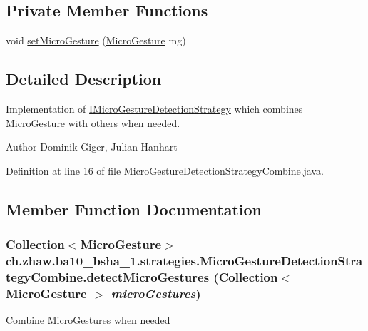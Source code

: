 \subsection*{Private Member Functions}
\begin{DoxyCompactItemize}
\item 
void \hyperlink{classch_1_1zhaw_1_1ba10__bsha__1_1_1strategies_1_1MicroGestureDetectionStrategyCombine_a06f12711cc267a6f8647dfb6faeb4787}{setMicroGesture} (\hyperlink{classch_1_1zhaw_1_1ba10__bsha__1_1_1service_1_1MicroGesture}{MicroGesture} mg)
\end{DoxyCompactItemize}


\subsection{Detailed Description}
Implementation of \hyperlink{interfacech_1_1zhaw_1_1ba10__bsha__1_1_1strategies_1_1IMicroGestureDetectionStrategy}{IMicroGestureDetectionStrategy} which combines \hyperlink{}{MicroGesture} with others when needed.

\begin{DoxyAuthor}{Author}
Dominik Giger, Julian Hanhart 
\end{DoxyAuthor}


Definition at line 16 of file MicroGestureDetectionStrategyCombine.java.

\subsection{Member Function Documentation}
\hypertarget{classch_1_1zhaw_1_1ba10__bsha__1_1_1strategies_1_1MicroGestureDetectionStrategyCombine_a5487e41dc2d1b6dbe493b5a8420c050f}{
\subsubsection[{detectMicroGestures}]{\setlength{\rightskip}{0pt plus 5cm}Collection$<${\bf MicroGesture}$>$ ch.zhaw.ba10\_\-bsha\_\-1.strategies.MicroGestureDetectionStrategyCombine.detectMicroGestures (Collection$<$ {\bf MicroGesture} $>$ {\em microGestures})}}
\label{classch_1_1zhaw_1_1ba10__bsha__1_1_1strategies_1_1MicroGestureDetectionStrategyCombine_a5487e41dc2d1b6dbe493b5a8420c050f}
Combine \hyperlink{}{MicroGesture}s when needed


